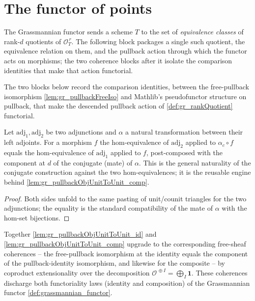 \section{The functor of points}
\label{sec:grquot_functor}

The Grassmannian functor sends a scheme \(T\) to the set of \emph{equivalence classes} of
rank-\(d\) quotients of \(\mathcal{O}_T^{\,r}\). The following block packages a single such
quotient, the equivalence relation on them, and the pullback action through which the
functor acts on morphisms; the two coherence blocks after it isolate the comparison
identities that make that action functorial.


The two blocks below record the comparison identities, between the free-pullback isomorphism
\cref{lem:gr_pullbackFreeIso} and Mathlib's pseudofunctor structure on pullback, that make
the descended pullback action of \cref{def:gr_rankQuotient} functorial.


\begin{lemma}
  \label{lem:gr_homEquiv_conjugateEquiv_app}
  Let \(\mathrm{adj}_1, \mathrm{adj}_2\) be two adjunctions and \(\alpha\) a natural
  transformation between their left adjoints. For a morphism \(f\) the hom-equivalence of
  \(\mathrm{adj}_2\) applied to \(\alpha_c \circ f\) equals the hom-equivalence of
  \(\mathrm{adj}_1\) applied to \(f\), post-composed with the component at \(d\) of the
  conjugate (mate) of \(\alpha\). This is the general naturality of the conjugate
  construction against the two hom-equivalences; it is the reusable engine behind
  \cref{lem:gr_pullbackObjUnitToUnit_comp}.
\end{lemma}

\begin{proof}


\leanok
  Both sides unfold to the same pasting of unit/counit triangles for the two adjunctions;
  the equality is the standard compatibility of the mate of \(\alpha\) with the
  hom-set bijections.
\end{proof}


Together \cref{lem:gr_pullbackObjUnitToUnit_id} and \cref{lem:gr_pullbackObjUnitToUnit_comp}
upgrade to the corresponding free-sheaf coherences -- the free-pullback isomorphism at the
identity equals the component of the pullback-identity isomorphism, and likewise for the
composite -- by coproduct extensionality over the decomposition
\(\mathcal{O}^{\,\oplus I} = \bigoplus_I \mathbf 1\). These coherences discharge both
functoriality laws (identity and composition) of the Grassmannian
functor \cref{def:grassmannian_functor}.


